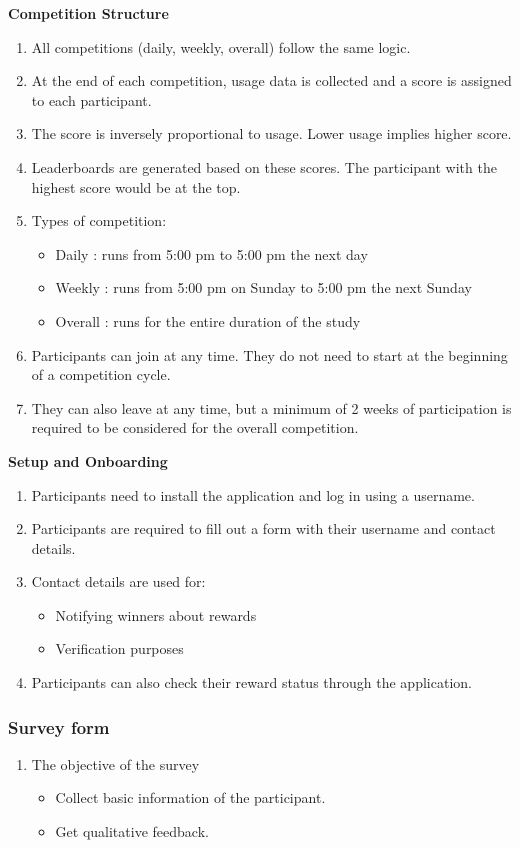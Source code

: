 \documentclass{article}
\begin{document}
\textbf{Competition Structure}
\begin{enumerate}
    \item All competitions (daily, weekly, overall) follow the same logic.
    \item At the end of each competition, usage data is collected and a score is assigned to each participant.
    \item The score is inversely proportional to usage. Lower usage implies higher score.
    \item Leaderboards are generated based on these scores. The participant with the highest score would be at the top.
    \item Types of competition:
    \begin{itemize}
        \item Daily : runs from 5:00 pm to 5:00 pm the next day
        \item Weekly : runs from 5:00 pm on Sunday to 5:00 pm the next Sunday
        \item Overall : runs for the entire duration of the study
    \end{itemize}
    \item Participants can join at any time. They do not need to start at the beginning of a competition cycle.
    \item They can also leave at any time, but a minimum of 2 weeks of participation is required to be considered for the overall competition.
\end{enumerate}

\textbf{Setup and Onboarding}
\begin{enumerate}
    \item Participants need to install the application and log in using a username.
    \item Participants are required to fill out a form with their username and contact details.
    \item Contact details are used for:
    \begin{itemize}
        \item Notifying winners about rewards
        \item Verification purposes
    \end{itemize}
    \item Participants can also check their reward status through the application.
\end{enumerate}


\subsubsection{Survey form}
\begin{enumerate}
    \item The objective of the survey
    \begin{itemize}
        \item Collect basic information of the participant.
        \item Get qualitative feedback.
    \end{itemize}
\end{enumerate}
\end{document}
